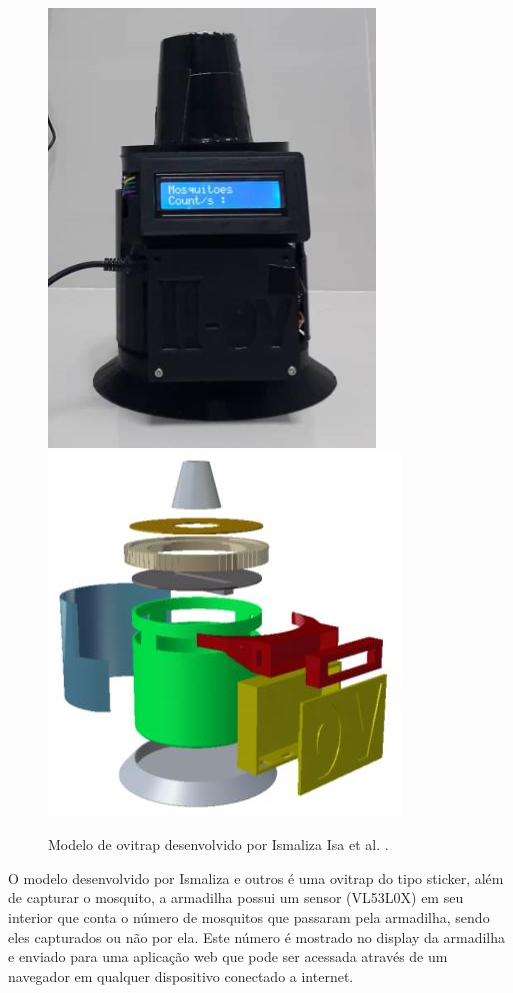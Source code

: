 \documentclass[
	12pt,				%
	openright,			%
	oneside,			%
	a4paper,			%
	chapter=TITLE,		%
	english,			%
	brazil				%
	]{abntex2}
\begin{document}
\begin{figure}[H]
\centering
\includegraphics[scale=0.4]{imagens/smartovitrap.png}
\includegraphics[scale=0.5]{imagens/smartovitrap2.png}
 \caption{Modelo de ovitrap desenvolvido por Ismaliza Isa et al. .}
    \label{fig:ovitrapIsmaliza}
\end{figure}

O modelo desenvolvido por Ismaliza e outros é uma ovitrap do tipo sticker,
além de capturar o mosquito, a armadilha possui um sensor (VL53L0X) em seu interior que conta o número
de mosquitos que passaram pela armadilha, sendo eles capturados ou não por
ela. Este número é mostrado no display da armadilha e enviado para uma aplicação web
que pode ser acessada através de um navegador em qualquer dispositivo conectado a
internet.
\end{document}
